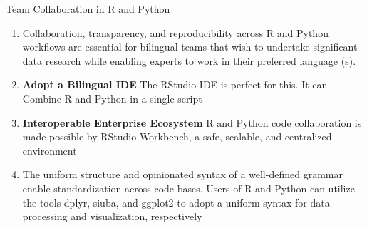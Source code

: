 \documentclass{beamer}
\begin{document}
	\begin{frame}[t]{Team Collaboration in R and Python}
		
		
		\begin{enumerate}
			\item Collaboration, transparency, and reproducibility across R and Python workflows are essential for bilingual teams that wish to undertake significant data research while enabling experts to work in their preferred language (s).
			\item \textbf {Adopt a Bilingual IDE}
			The RStudio IDE is perfect for this. It can Combine R and Python in a single script
			\item \textbf{Interoperable Enterprise Ecosystem}	R and Python code collaboration is made possible by RStudio Workbench, a safe, scalable, and centralized environment
			\item The uniform structure and opinionated syntax of a well-defined grammar enable standardization across code bases. Users of R and Python can utilize the tools dplyr, siuba, and ggplot2 to adopt a uniform syntax for data processing and visualization, respectively
		\end{enumerate}
	\end{frame}
	
\end{document}
